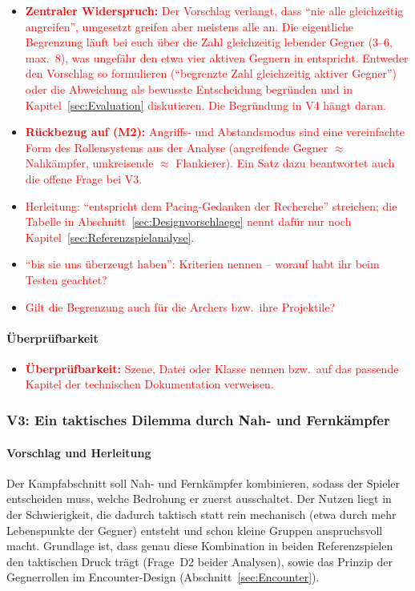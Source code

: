 \documentclass[../Main.tex]{subfiles}
\begin{document}
\begin{itemize}[leftmargin=1.5cm]
    \item \textcolor{red}{\textbf{Zentraler Widerspruch:} Der Vorschlag verlangt, dass \enquote{nie alle gleichzeitig angreifen}, umgesetzt greifen aber meistens alle an. Die eigentliche Begrenzung läuft bei euch über die Zahl gleichzeitig lebender Gegner (3--6, max.\ 8), was ungefähr den etwa vier aktiven Gegnern in  entspricht. Entweder den Vorschlag so formulieren (\enquote{begrenzte Zahl gleichzeitig aktiver Gegner}) oder die Abweichung als bewusste Entscheidung begründen und in Kapitel~\ref{sec:Evaluation} diskutieren. Die Begründung in V4 hängt daran.}
    \item \textcolor{red}{\textbf{Rückbezug auf  (M2):} Angriffs- und Abstandsmodus sind eine vereinfachte Form des Rollensystems aus der Analyse (angreifende Gegner $\approx$ Nahkämpfer, umkreisende $\approx$ Flankierer). Ein Satz dazu beantwortet auch die offene Frage bei V3.}
    \item \textcolor{red}{Herleitung: \enquote{entspricht dem Pacing-Gedanken der Recherche} streichen; die Tabelle in Abschnitt~\ref{sec:Designvorschlaege} nennt dafür nur noch Kapitel~\ref{sec:Referenzspielanalyse}.}
    \item \textcolor{red}{\enquote{bis sie uns überzeugt haben}: Kriterien nennen -- worauf habt ihr beim Testen geachtet?}
    \item \textcolor{red}{Gilt die Begrenzung auch für die Archers bzw.\ ihre Projektile?}
\end{itemize}

\paragraph{Überprüfbarkeit}
\begin{itemize}[leftmargin=1.5cm]
    \item \textcolor{red}{\textbf{Überprüfbarkeit:} Szene, Datei oder Klasse nennen bzw.\ auf das passende Kapitel der technischen Dokumentation verweisen.}
\end{itemize}

\subsubsection{V3: Ein taktisches Dilemma durch Nah- und Fernkämpfer} \label{sec:V3}

\paragraph{Vorschlag und Herleitung}
Der Kampfabschnitt soll Nah- und Fernkämpfer kombinieren, sodass der Spieler entscheiden muss, welche Bedrohung er zuerst ausschaltet. Der Nutzen liegt in der Schwierigkeit, die dadurch taktisch statt rein mechanisch (etwa durch mehr Lebenspunkte der Gegner) entsteht und schon kleine Gruppen anspruchsvoll macht. Grundlage ist, dass genau diese Kombination in beiden Referenzspielen den taktischen Druck trägt (Frage~D2 beider Analysen), sowie das Prinzip der Gegnerrollen im Encounter-Design (Abschnitt~\ref{sec:Encounter}).
\end{document}
